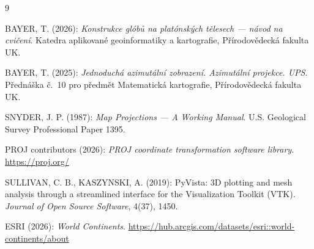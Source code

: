 \documentclass[11pt, a4paper]{article}
\begin{document}
\newpage
\renewcommand{\refname}{Zdroje} 
\begin{thebibliography}{9}

 BAYER, T. (2026): \textit{Konstrukce glóbů na platónských tělesech --- návod na cvičení}. Katedra aplikované geoinformatiky a kartografie, Přírodovědecká fakulta UK.

 BAYER, T. (2025): \textit{Jednoduchá azimutální zobrazení. Azimutální projekce. UPS}. Přednáška č.~10 pro předmět Matematická kartografie, Přírodovědecká fakulta UK.

 SNYDER, J. P. (1987): \textit{Map Projections --- A Working Manual}. U.S. Geological Survey Professional Paper 1395.

 PROJ contributors (2026): \textit{PROJ coordinate transformation software library}. \url{https://proj.org/}

 SULLIVAN, C. B., KASZYNSKI, A. (2019): PyVista: 3D plotting and mesh analysis through a streamlined interface for the Visualization Toolkit (VTK). \textit{Journal of Open Source Software}, 4(37), 1450.

 ESRI (2026): \textit{World Continents}. \url{https://hub.arcgis.com/datasets/esri::world-continents/about}

\end{thebibliography}
\end{document}
